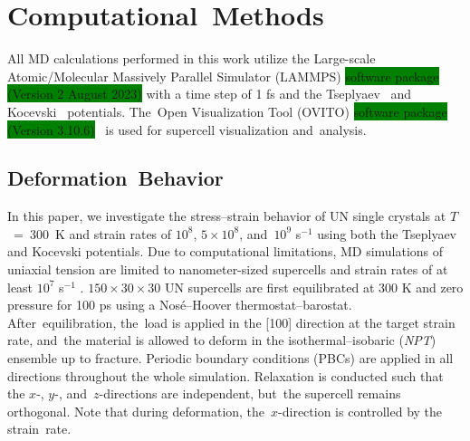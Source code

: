 \documentclass[applsci,article,accept,pdftex,moreauthors]{Definitions/mdpi}
\newcommand{\?}{\stackrel{?}{=}}
\begin{document}
\section{Computational~Methods}

All MD calculations performed in this work utilize the Large-scale Atomic/Molecular Massively Parallel Simulator (LAMMPS) \colorbox{green}{software package (Version 2 August 2023)} %
 \cite{Thompson2022} with a time step of 1 fs and the Tseplyaev~\cite{Tseplyaev2016} and Kocevski~\cite{Kocevski2022II} potentials. The~Open Visualization Tool (OVITO) \colorbox{green}{software package (Version 3.10.6)}~\cite{Stukowski2010} is used for supercell visualization and~analysis.

\subsection{Deformation~Behavior}

In this paper, we investigate the stress--strain behavior of UN single crystals at \mbox{$T$ = 300 K} and strain rates of $10^8$, $5 \times 10^8$, and~$10^9$ s$^{-1}$ using both the Tseplyaev and Kocevski potentials. Due to computational limitations, MD simulations of uniaxial tension are limited to nanometer-sized supercells and strain rates of at least $10^7$ s$^{-1}$ \cite{Lao2013}. $150 \times 30 \times 30$ UN supercells are first equilibrated at 300 K and zero pressure for 100 ps using a Nosé--Hoover thermostat--barostat. After~equilibration, the~load is applied in the [100] direction at the target strain rate, and~the material is allowed to deform in the isothermal--isobaric (\textit{NPT}) ensemble up to fracture. Periodic boundary conditions (PBCs) are applied in all directions throughout the whole simulation. Relaxation is conducted such that the $x$-, $y$-, and~$z$-directions are independent, but~the supercell remains orthogonal. Note that during deformation, the~$x$-direction is controlled by the strain~rate.
\end{document}
